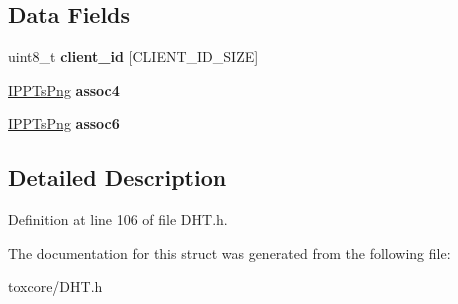 \subsection*{Data Fields}
\begin{DoxyCompactItemize}
\item 
\hypertarget{struct_client__data_a72f2085432efcbf0f872298100b06a17}{uint8\+\_\+t {\bfseries client\+\_\+id} \mbox{[}C\+L\+I\+E\+N\+T\+\_\+\+I\+D\+\_\+\+S\+I\+Z\+E\mbox{]}}\label{struct_client__data_a72f2085432efcbf0f872298100b06a17}

\item 
\hypertarget{struct_client__data_ac9843379cbcd02bdfa5c180a1474a6c5}{\hyperlink{struct_i_p_p_ts_png}{I\+P\+P\+Ts\+Png} {\bfseries assoc4}}\label{struct_client__data_ac9843379cbcd02bdfa5c180a1474a6c5}

\item 
\hypertarget{struct_client__data_a87d394929a2604f6f785fec949fac618}{\hyperlink{struct_i_p_p_ts_png}{I\+P\+P\+Ts\+Png} {\bfseries assoc6}}\label{struct_client__data_a87d394929a2604f6f785fec949fac618}

\end{DoxyCompactItemize}


\subsection{Detailed Description}


Definition at line 106 of file D\+H\+T.\+h.



The documentation for this struct was generated from the following file\+:\begin{DoxyCompactItemize}
\item 
toxcore/D\+H\+T.\+h\end{DoxyCompactItemize}
